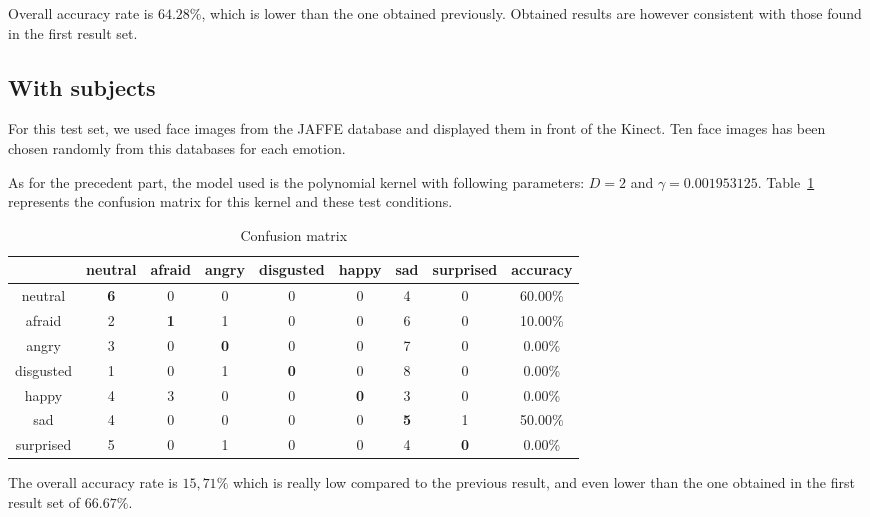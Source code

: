 \noindent Overall accuracy rate is $ 64.28\% $, which is lower than the one obtained previously. Obtained results are however consistent with those found in the first result set.
\newline

\subsection{With subjects}

\vspace{\baselineskip}
\noindent For this test set, we used face images from the JAFFE database and displayed them in front of the Kinect. Ten face images has been chosen randomly from this databases for each emotion.
\newline

\noindent As for the precedent part, the model used is the polynomial kernel with following parameters: $ D = 2 $ and $ \gamma = 0.001953125 $. Table~\ref{table_results_confusion_matrix_jaffe} represents the confusion matrix for this kernel and these test conditions.
\newline

\begin{table}[h]
\begin{center}
   \caption{\label{table_results_confusion_matrix_jaffe} Confusion matrix}
\begin{tabular}{|c|c|c|c|c|c|c|c|c|}
  \hline
   & neutral & afraid & angry & disgusted & happy & sad & surprised & accuracy \\
  \hline
  neutral & \textbf{6} & 0 & 0 & 0 & 0 & 4 & 0 & 60.00\% \\
  afraid & 2 & \textbf{1} & 1 & 0 & 0 & 6 & 0 & 10.00\% \\
  angry & 3 & 0 & \textbf{0} & 0 & 0 & 7 & 0 & 0.00\% \\
  disgusted & 1 & 0 & 1 & \textbf{0} & 0 & 8 & 0 & 0.00\% \\
  happy & 4 & 3 & 0 & 0 & \textbf{0} & 3 & 0 & 0.00\% \\
  sad & 4 & 0 & 0 & 0 & 0 & \textbf{5} & 1 & 50.00\% \\
  surprised & 5 & 0 & 1 & 0 & 0 & 4 & \textbf{0} & 0.00\%\\
  \hline
\end{tabular}
\end{center}
\end{table}

\noindent The overall accuracy rate is $ 15,71\% $ which is really low compared to the previous result, and even lower than the one obtained in the first result set of $ 66.67\% $. 

